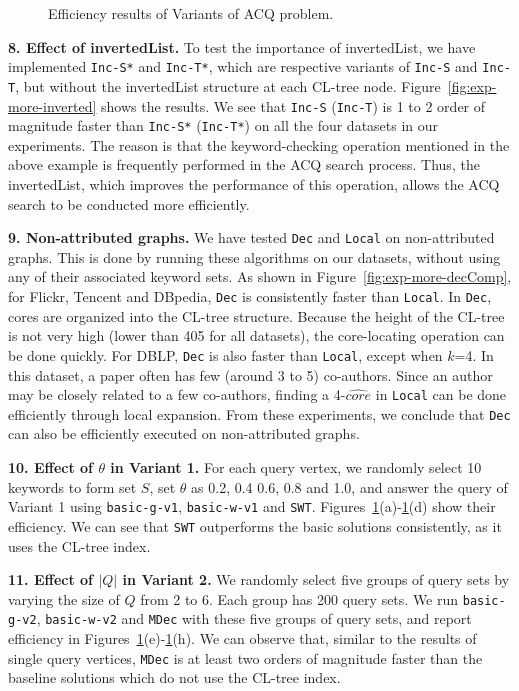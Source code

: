 \begin{figure}[htb]
\begin{tabular}{c c c c}
\end{tabular}
\caption{Efficiency results of Variants of ACQ problem.}
\label{fig:exp-variant}
\end{figure}


\textbf{8. Effect of invertedList.}
To test the importance of invertedList, we have implemented {\tt Inc-S*} and {\tt Inc-T*}, which are respective variants of {\tt Inc-S} and {\tt Inc-T}, but without the invertedList structure at each CL-tree node. Figure~\ref{fig:exp-more-inverted} shows the results. We see that {\tt Inc-S} ({\tt Inc-T}) is 1 to 2 order of magnitude faster than {\tt Inc-S*} ({\tt Inc-T*}) on all the four datasets in our experiments.
The reason is that the keyword-checking operation mentioned in the above example is frequently performed in the ACQ search process. Thus, the invertedList, which improves the performance of this operation, allows the ACQ search to be conducted more efficiently.

\textbf{9. Non-attributed graphs.}
We have tested {\tt Dec} and {\tt Local} on non-attributed graphs. This is done by running these algorithms on our datasets, without using any of their associated keyword sets. As shown in Figure~\ref{fig:exp-more-decComp}, for Flickr, Tencent and DBpedia, {\tt Dec} is consistently faster than {\tt Local}. In {\tt Dec}, cores are organized into the CL-tree structure. Because the height of the CL-tree is not very high (lower than 405 for all datasets), the core-locating operation can be done quickly. For DBLP, {\tt Dec} is also  faster than {\tt Local}, except when $k$=4. In this dataset, a paper often has few (around 3 to 5) co-authors. Since an author may be closely related to a few co-authors, finding a 4-$\widehat {core}$ in {\tt Local} can be done efficiently through local expansion.  From these experiments, we conclude that {\tt Dec} can also be efficiently executed on non-attributed graphs.

{\color{blue}
\textbf{10. Effect of $\theta$ in Variant 1.}
For each query vertex, we randomly select 10 keywords to form set $S$, set $\theta$ as 0.2, 0.4 0.6, 0.8 and 1.0,
and answer the query of Variant 1 using {\tt basic-g-v1}, {\tt basic-w-v1} and {\tt SWT}.
Figures~\ref{fig:exp-variant}(a)-\ref{fig:exp-variant}(d) show their efficiency.
We can see that {\tt SWT} outperforms the basic solutions consistently, as it uses the CL-tree index.

\textbf{11. Effect of $|Q|$ in Variant 2.}
We randomly select five groups of query sets by varying the size of $Q$ from 2 to 6.
Each group has 200 query sets.
We run {\tt basic-g-v2}, {\tt basic-w-v2} and {\tt MDec} with these five groups of query sets,
and report efficiency in Figures~\ref{fig:exp-variant}(e)-\ref{fig:exp-variant}(h).
We can observe that, similar to the results of single query vertices, {\tt MDec} is at least two orders of magnitude faster than the baseline solutions which do not use the CL-tree index.
}
